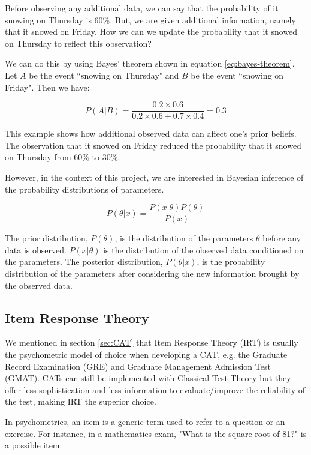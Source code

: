 Before observing any additional data, we can say that the probability of it snowing on Thursday is 60\%. But, we are given additional information, namely that it snowed on Friday. How we can we update the probability that it snowed on Thursday to reflect this observation? \newline

We can do this by using Bayes' theorem shown in equation \ref{eq:bayes-theorem}. Let $A$ be the event ``snowing on Thursday" and $B$ be the event ``snowing on Friday". Then we have:

$$P(A|B) = \dfrac{0.2 \times 0.6}{0.2 \times 0.6 + 0.7 \times 0.4} = 0.3$$

This example shows how additional observed data can affect one's prior beliefs. The observation that it snowed on Friday reduced the probability that it snowed on Thursday from 60\% to 30\%.
\newline

However, in the context of this project, we are interested in Bayesian inference of the probability distributions of parameters.

$$P(\theta|x) = \dfrac{P(x|\theta)P(\theta)}{P(x)}$$

The prior distribution, $P(\theta)$, is the distribution of the parameters $\theta$ before any data is observed. $P(x|\theta)$ is the distribution of the observed data conditioned on the parameters. The posterior distribution, $P(\theta|x)$, is the probability distribution of the parameters after considering the new information brought by the observed data.

\subsection{Item Response Theory}
\label{subsec:IRT}
We mentioned in section \ref{sec:CAT} that Item Response Theory (IRT) is usually the psychometric model of choice when developing a CAT, e.g. the Graduate Record Examination (GRE) and Graduate Management Admission Test (GMAT). CATs can still be implemented with Classical Test Theory but they offer less sophistication and less information to evaluate/improve the reliability of the test, making IRT the superior choice. \newline

In psychometrics, an item is a generic term used to refer to a question or an exercise. For instance, in a mathematics exam, "What is the square root of 81?" is a possible item. \newline

